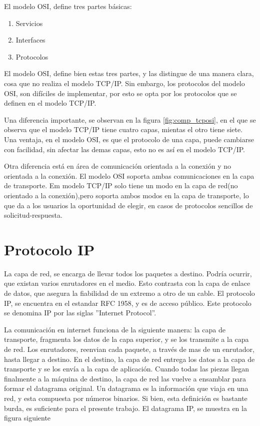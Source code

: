 El modelo OSI, define tres partes básicas: 
\begin{enumerate}
	\item Servicios 
	\item Interfaces 
	\item Protocolos
\end{enumerate}

El modelo OSI, define bien estas tres partes, y las distingue de una manera clara, cosa que no realiza el modelo TCP/IP. Sin embargo, los protocolos del modelo OSI, son difíciles de implementar, por esto se opta por los protocolos que se definen en el modelo TCP/IP. 

Una diferencia importante, se observan en la figura \ref{fig:comp_tcposi}, en el que se observa que el modelo TCP/IP tiene cuatro capas, mientas el otro tiene siete. Una ventaja, en el modelo OSI, es que el protocolo de una capa, puede cambiarse con facilidad, sin afectar las demas capas, esto no es así en el modelo TCP/IP. 

Otra diferencia está en área de comunicación orientada a la conexión y no orientada a la conexión. El modelo OSI soporta ambas comunicaciones en la capa de transporte. Em modelo TCP/IP solo tiene un modo en la capa de red(no orientado a la conexión),pero soporta ambos modos en la capa de transporte, lo que da a los usuarios la oportunidad de elegir, en casos de protocolos sencillos de solicitud-respuesta.  




\section{Protocolo IP} 
La capa de red, se encarga de llevar todos los paquetes a destino. Podría ocurrir, que existan varios enrutadores en el medio. Esto contrasta con la capa de enlace de datos, que asegura la fiabilidad de un extremo a otro de un cable. El protocolo IP, se encuentra en el estandar RFC 1958, y es de acceso público. Este protocolo se denomina IP por las siglas ''Internet Protocol''. 

La comunicación en internet funciona de la siguiente manera: la capa de transporte, fragmenta los datos de la capa superior, y se los transmite a la capa de red. Los enrutadores, reenvian cada paquete, a través de mas de un enrutador, hasta llegar a destino. En el destino, la capa de red entrega los datos a la capa de transporte y se los envía a la capa de aplicación. Cuando todas las piezas llegan finalmente a la máquina de destino, la capa de red las vuelve a ensamblar para formar el datagrama original. Un datagrama es la información que viaja en una red, y esta compuesta por números binarios. Si bien, esta definición es bastante burda, es suficiente para el presente trabajo. El datagrama IP, se muestra en la figura siguiente 

